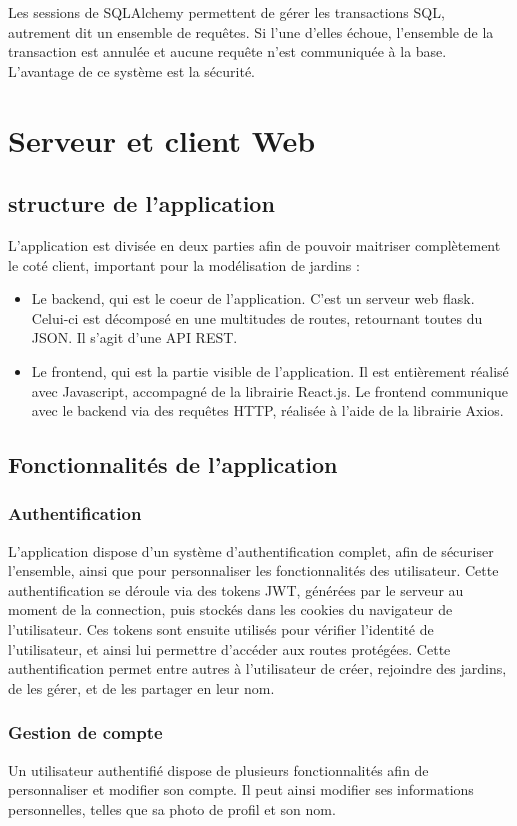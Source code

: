 \documentclass[french,a4paper]{article}
\begin{document}
Les sessions de SQLAlchemy permettent de gérer les transactions SQL, autrement dit un ensemble de requêtes. Si l'une d'elles échoue,
l'ensemble de la transaction est annulée et aucune requête n'est communiquée à la base. L’avantage de ce système est la sécurité.

\newpage
\section{Serveur et client Web}
\subsection{structure de l'application}
L'application est divisée en deux parties afin de pouvoir maitriser complètement le coté client, important pour la modélisation de jardins :
\begin{itemize}
    \item Le backend, qui est le coeur de l'application. C'est un serveur web flask. Celui-ci est décomposé en une multitudes de routes, retournant toutes du JSON. Il s'agit d'une API REST.
    \item Le frontend, qui est la partie visible de l'application. Il est entièrement réalisé avec Javascript, accompagné de la librairie React.js. Le frontend communique avec le backend via des requêtes HTTP, réalisée à l'aide de la librairie Axios.
\end{itemize}
\subsection{Fonctionnalités de l'application}
\subsubsection{Authentification}
L'application dispose d'un système d'authentification complet, afin de sécuriser l'ensemble, ainsi que pour personnaliser les fonctionnalités des utilisateur. Cette authentification se déroule via des tokens JWT, générées par le serveur au moment de la connection, puis stockés dans les cookies du navigateur de l'utilisateur. Ces tokens sont ensuite utilisés pour vérifier l'identité de l'utilisateur, et ainsi lui permettre d'accéder aux routes protégées.
Cette authentification permet entre autres à l'utilisateur de créer, rejoindre des jardins, de les gérer, et de les partager en leur nom.

\subsubsection{Gestion de compte}
Un utilisateur authentifié dispose de plusieurs fonctionnalités afin de personnaliser et modifier son compte. Il peut ainsi modifier ses informations personnelles, telles que sa photo de profil et son nom.
\end{document}
